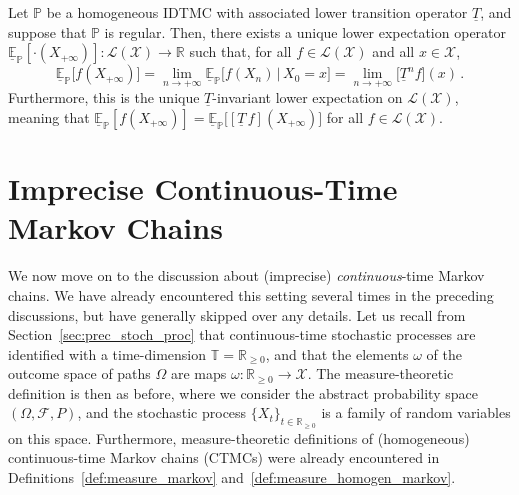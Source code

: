 \documentclass[graybox]{svmult}
\newcommand{\reals}{\mathbb{R}}
\newcommand{\realsnonneg}{\reals_{\geq 0}}
\newcommand{\states}{\mathcal{X}}
\newcommand{\gambles}{\mathcal{L}}
\newcommand{\gamblesX}{\gambles(\states)}
\newcommand{\timedim}{\mathbb{T}}
\begin{document}
\begin{theorem}\label{theo:idtmc_ergodic_simple}
Let $\mathbb{P}$ be a homogeneous IDTMC with associated lower transition operator $\underline{T}$, and suppose that $\mathbb{P}$ is regular. Then, there exists a unique lower expectation operator $\underline{\mathbb{E}}_\mathbb{P}[\cdot(X_{+\infty})]:\gamblesX\to\reals$ such that, for all $f\in\gamblesX$ and all $x\in\states$,
\begin{equation*}
\underline{\mathbb{E}}_\mathbb{P}\bigl[f(X_{+\infty})\bigr] = \lim_{n\to+\infty} \underline{\mathbb{E}}_\mathbb{P}\bigl[f(X_n)\,\vert\,X_0=x\bigr] = \lim_{n\to+\infty} \bigl[\underline{T}^nf\bigr](x)\,.
\end{equation*}
Furthermore, this is the unique $\underline{T}$-invariant lower expectation on $\gamblesX$, meaning that $\underline{\mathbb{E}}_\mathbb{P}[f(X_{+\infty})]= \underline{\mathbb{E}}_\mathbb{P}\bigl[[\underline{T}\,f](X_{+\infty})\bigr]$ for all $f\in\gamblesX$.
\end{theorem}

\section{Imprecise Continuous-Time Markov Chains}\label{sec:ictmc}

We now move on to the discussion about (imprecise) \emph{continuous}-time Markov chains. We have already encountered this setting several times in the preceding discussions, but have generally skipped over any details. Let us recall from Section~\ref{sec:prec_stoch_proc} that continuous-time stochastic processes are identified with a time-dimension $\timedim=\realsnonneg$, and that the elements $\omega$ of the outcome space of paths $\Omega$ are maps $\omega:
\realsnonneg\to\states$. The measure-theoretic definition is then as before, where we consider the abstract probability space $(\Omega,\mathcal{F},P)$, and the stochastic process $\{X_t\}_{t\in\realsnonneg}$ is a family of random variables on this space. Furthermore, measure-theoretic definitions of (homogeneous) continuous-time Markov chains (CTMCs) were already encountered in Definitions~\ref{def:measure_markov} and~\ref{def:measure_homogen_markov}.
\end{document}
